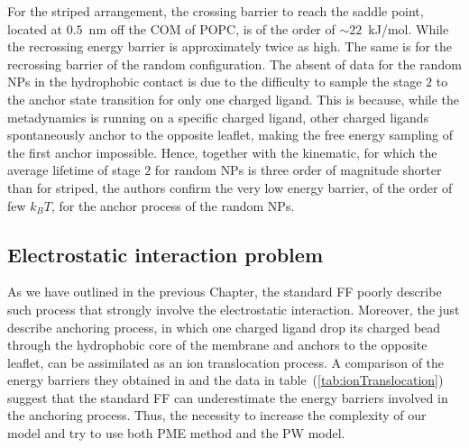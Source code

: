 For the striped arrangement, the crossing barrier to reach the saddle point, located at $0.5$~nm off the \ac{COM} of \ac{POPC}, is of the order of $\sim 22$~kJ/mol. While the recrossing energy barrier is approximately twice as high. The same is for the recrossing barrier of the random configuration. The absent of data for the random \acp{NP} in the hydrophobic contact is due to the difficulty to sample the stage $2$ to the anchor state transition for only one charged ligand. This is because, while the metadynamics is running on a specific charged ligand, other charged ligands spontaneously anchor to the opposite leaflet, making the free energy sampling of the first anchor impossible. Hence, together with the kinematic, for which the average lifetime of stage $2$ for random \acp{NP} is three order of magnitude shorter than for striped, the authors confirm the very low energy barrier, of the order of few $k_B T$, for the anchor process of the random \acp{NP}.


\subsection{Electrostatic interaction problem}
As we have outlined in the previous Chapter, the standard \martini \ac{FF} poorly describe such process that strongly involve the electrostatic interaction. Moreover, the just describe anchoring process, in which one charged ligand drop its charged bead through the hydrophobic core of the membrane and anchors to the opposite leaflet, can be assimilated as an ion translocation process. A comparison of the energy barriers they obtained in \cite{ourPaper} and the data in table~(\ref{tab:ionTranslocation}) suggest that the standard \martini \ac{FF} can underestimate the energy barriers involved in the anchoring process. Thus, the necessity to increase the complexity of our model and try to use both \ac{PME} method and the \ac{PW} model. 

